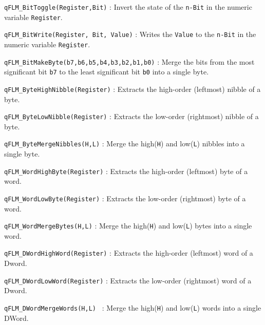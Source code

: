 \lstinline{qFLM_BitToggle(Register,Bit)} : Invert the state of the \lstinline{n-Bit} in the numeric variable \lstinline{Register}.

\noindent\hrulefill

\lstinline{qFLM_BitWrite(Register, Bit, Value)} : Writes the \lstinline{Value} to the \lstinline{n-Bit} in the numeric variable \lstinline{Register}.

\noindent\hrulefill

\lstinline{qFLM_BitMakeByte(b7,b6,b5,b4,b3,b2,b1,b0)} : Merge the bits from the most significant bit \lstinline{b7} to the least significant bit \lstinline{b0} into a single byte.

\noindent\hrulefill

\lstinline{qFLM_ByteHighNibble(Register)} : Extracts the  high-order (leftmost) nibble of a byte.

\noindent\hrulefill

\lstinline{qFLM_ByteLowNibble(Register)} : Extracts the low-order (rightmost) nibble of a byte.

\noindent\hrulefill

\lstinline{qFLM_ByteMergeNibbles(H,L)} :  Merge the high(\lstinline{H}) and low(\lstinline{L}) nibbles into a single byte.

\noindent\hrulefill

\lstinline{qFLM_WordHighByte(Register)} : Extracts the high-order (leftmost) byte of a word.

\noindent\hrulefill

\lstinline{qFLM_WordLowByte(Register)} : Extracts the low-order (rightmost) byte of a word.

\noindent\hrulefill

\lstinline{qFLM_WordMergeBytes(H,L)} : Merge the high(\lstinline{H}) and low(\lstinline{L}) bytes into a single word.

\noindent\hrulefill

\lstinline{qFLM_DWordHighWord(Register)} : Extracts the high-order (leftmost) word of a Dword.

\noindent\hrulefill

\lstinline{qFLM_DWordLowWord(Register)} : Extracts the low-order (rightmost) word of a Dword.

\noindent\hrulefill

\lstinline{qFLM_DWordMergeWords(H,L) } : Merge the high(\lstinline{H}) and low(\lstinline{L}) words into a single DWord.

\noindent\hrulefill

